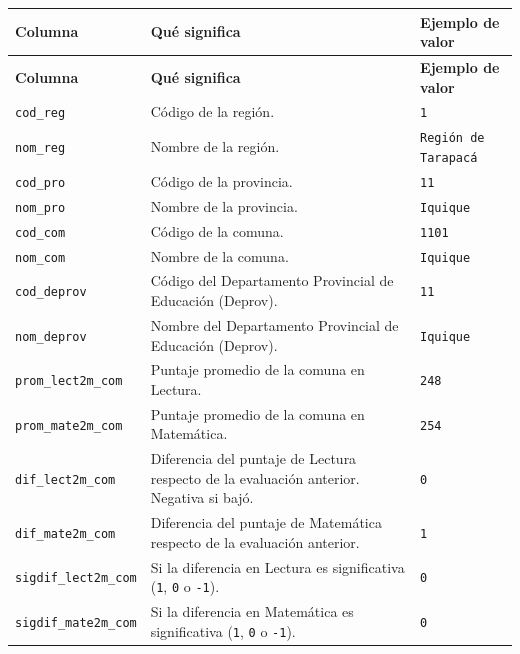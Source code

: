\documentclass[10.5pt]{article}
\newcommand{\hdr}[1]{\textbf{\color{white}#1}}
\begin{document}
\begin{xltabular}{\linewidth}{@{}p{4.5cm} >{\raggedright\arraybackslash}X p{3.4cm}@{}}
\hdr{Columna} & \hdr{Qué significa} & \hdr{Ejemplo de valor} \\
\endfirsthead
{}\hdr{Columna} & \hdr{Qué significa} & \hdr{Ejemplo de valor} \\
\endhead
\texttt{cod\_\allowbreak{}reg} & Código de la región. & \texttt{1} \\
\texttt{nom\_\allowbreak{}reg} & Nombre de la región. & \texttt{Región de Tarapacá} \\
\texttt{cod\_\allowbreak{}pro} & Código de la provincia. & \texttt{11} \\
\texttt{nom\_\allowbreak{}pro} & Nombre de la provincia. & \texttt{Iquique} \\
\texttt{cod\_\allowbreak{}com} & Código de la comuna. & \texttt{1101} \\
\texttt{nom\_\allowbreak{}com} & Nombre de la comuna. & \texttt{Iquique} \\
\texttt{cod\_\allowbreak{}deprov} & Código del Departamento Provincial de Educación (Deprov). & \texttt{11} \\
\texttt{nom\_\allowbreak{}deprov} & Nombre del Departamento Provincial de Educación (Deprov). & \texttt{Iquique} \\
\texttt{prom\_\allowbreak{}lect2m\_\allowbreak{}com} & Puntaje promedio de la comuna en Lectura. & \texttt{248} \\
\texttt{prom\_\allowbreak{}mate2m\_\allowbreak{}com} & Puntaje promedio de la comuna en Matemática. & \texttt{254} \\
\texttt{dif\_\allowbreak{}lect2m\_\allowbreak{}com} & Diferencia del puntaje de Lectura respecto de la evaluación anterior. Negativa si bajó. & \texttt{0} \\
\texttt{dif\_\allowbreak{}mate2m\_\allowbreak{}com} & Diferencia del puntaje de Matemática respecto de la evaluación anterior. & \texttt{1} \\
\texttt{sigdif\_\allowbreak{}lect2m\_\allowbreak{}com} & Si la diferencia en Lectura es significativa (\texttt{1}, \texttt{0} o \texttt{-1}). & \texttt{0} \\
\texttt{sigdif\_\allowbreak{}mate2m\_\allowbreak{}com} & Si la diferencia en Matemática es significativa (\texttt{1}, \texttt{0} o \texttt{-1}). & \texttt{0} \\

\end{xltabular}
\end{document}
